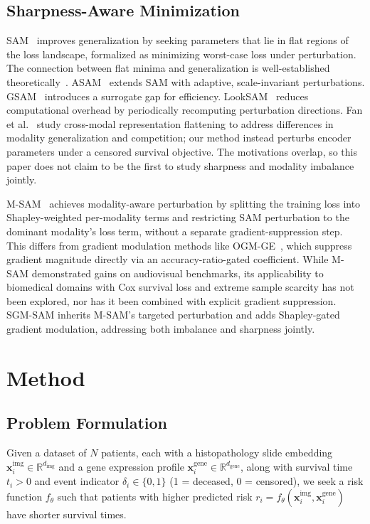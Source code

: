 \documentclass[runningheads]{llncs}
\begin{document}
\subsection{Sharpness-Aware Minimization}

SAM~\cite{foret2021sam} improves generalization by seeking parameters
that lie in flat regions of the loss landscape, formalized as
minimizing worst-case loss under perturbation. The connection between
flat minima and generalization is well-established
theoretically~\cite{hochreiter1997flat, jiang2020fantastic,
andriushchenko2023sam}. ASAM~\cite{kwon2021asam} extends SAM with
adaptive, scale-invariant perturbations.
GSAM~\cite{zhuang2022gsam} introduces a surrogate gap for efficiency.
LookSAM~\cite{liu2022looksam} reduces computational overhead by
periodically recomputing perturbation directions.
Fan et al.~\cite{fan2024flatten} study cross-modal representation
flattening to address differences in modality generalization
and competition; our method instead perturbs encoder parameters
under a censored survival objective. The motivations overlap,
so this paper does not claim to be the first to study sharpness
and modality imbalance jointly.

M-SAM~\cite{rajoli2025msam} achieves modality-aware perturbation by
splitting the training loss into Shapley-weighted per-modality terms
and restricting SAM perturbation to the dominant modality's loss
term, without a separate gradient-suppression step. This differs from
gradient modulation methods like OGM-GE~\cite{peng2022ogm}, which
suppress gradient magnitude directly via an accuracy-ratio-gated
coefficient. While M-SAM demonstrated gains on audiovisual
benchmarks, its applicability to biomedical domains with Cox survival
loss and extreme sample scarcity has not been explored, nor has it
been combined with explicit gradient suppression. SGM-SAM inherits
M-SAM's targeted perturbation and adds Shapley-gated gradient
modulation, addressing both imbalance and sharpness jointly.

\section{Method}

\subsection{Problem Formulation}

Given a dataset of $N$ patients, each with a histopathology slide
embedding $\mathbf{x}_i^{\text{img}} \in \mathbb{R}^{d_{\text{img}}}$
and a gene expression profile
$\mathbf{x}_i^{\text{gene}} \in \mathbb{R}^{d_{\text{gene}}}$,
along with survival time $t_i > 0$ and event indicator
$\delta_i \in \{0, 1\}$ (1 = deceased, 0 = censored), we seek a risk
function $f_\theta$ such that patients with higher predicted risk
$r_i = f_\theta(\mathbf{x}_i^{\text{img}},
\mathbf{x}_i^{\text{gene}})$ have shorter survival times.
\end{document}
